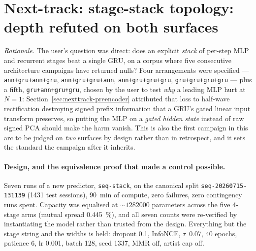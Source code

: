 \documentclass[11pt]{article}
\newcommand{\dsid}[1]{\texttt{\small #1}}
\begin{document}
\section{Next-track: stage-stack topology: depth refuted on both surfaces}
\label{sec:nexttrack-stagestack}
\emph{Rationale.} The user's question was direct: does an explicit \emph{stack} of
per-step MLP and recurrent stages beat a single GRU, on a corpus where five
consecutive architecture campaigns have returned nulls? Four arrangements were
specified --- \texttt{ann+gru+ann+gru}, \texttt{ann+gru+gru+ann},
\texttt{ann+gru+gru+gru}, \texttt{gru+gru+gru+gru} --- plus a fifth,
\texttt{gru+ann+gru+gru}, chosen by the user to test \emph{why} a leading MLP hurt
at $N=1$: Section~\ref{sec:nexttrack-preencoder} attributed that loss to half-wave
rectification destroying signed prefix information that a GRU's gated linear input
transform preserves, so putting the MLP on a \emph{gated hidden state} instead of
raw signed PCA should make the harm vanish. This is also the first campaign in this
arc to be judged on \emph{two} surfaces by design rather than in retrospect, and it
sets the standard the campaign after it inherits.

\paragraph{Design, and the equivalence proof that made a control possible.} Seven
runs of a new predictor, \texttt{seq-stack}, on the canonical split
\dsid{seq-20260715-131139} (\num{1431} test sessions), \SI{90}{\minute} of compute,
zero failures, zero contingency runs spent. Capacity was equalised at
${\sim}\num{1282000}$ parameters across the five 4-stage arms (mutual spread
\SI{0.445}{\percent}), and all seven counts were re-verified by instantiating the
model rather than trusted from the design. Everything but the stage string and the
widths is held: dropout \num{0.1}, InfoNCE, $\tau$~\num{0.07}, \num{40} epochs,
patience \num{6}, lr \num{0.001}, batch \num{128}, seed \num{1337}, MMR off, artist
cap off.
\end{document}
